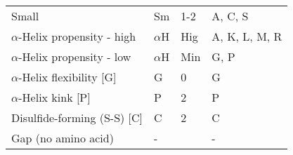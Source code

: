 \begin{table}[H]
{\begin{tabular}{llll}
                                   Small &           Sm &              1-2 &                       A, C, S \\
               $\alpha$-Helix propensity - high &           $\alpha$H &              Hig &                 A, K, L, M, R \\
                $\alpha$-Helix propensity - low &           $\alpha$H &              Min &                          G, P \\
                 $\alpha$-Helix flexibility [G] &            G &                0 &                             G \\
                        $\alpha$-Helix kink [P] &            P &                2 &                             P \\
             Disulfide-forming (S-S) [C] &            C &                2 &                             C \\
                     Gap (no amino acid) &            - &                  &                             - \\
\bottomrule
\end{tabular}
 }
\end{table}
